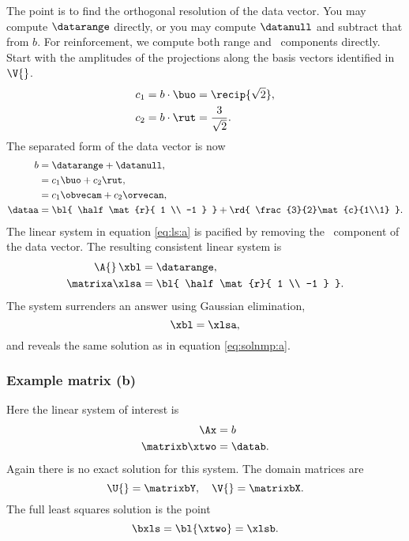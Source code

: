 %
The point is to find the orthogonal resolution of the data vector. You may compute $\datarange$ directly, or you may compute $\datanull$ and subtract that from $b$. For reinforcement, we compute both range and \ns\ components directly. Start with the amplitudes of the projections along the basis vectors identified in $\V{}$. 
\begin{equation}
  \begin{split}
    c_{1} = b \cdot \buo &= \recip{\sqrt{2}} , \\
    c_{2} = b \cdot \rut &= \frac{3}{\sqrt{2}} .
  \end{split}
\end{equation}
%
The separated form of the data vector is now
%
\begin{equation}
  \begin{split}
     b &= \datarange + \datanull, \\
       &= c_{1} \buo + c_{2} \rut, \\
       &= c_{1}\obvecam + c_{2}\orvecan, \\
     \dataa &= {\bl{ \half \mat{r}{ 1 \\ -1 } }} + {\rd{ \frac{3}{2}\mat{c}{1\\1} }}.
  \end{split}
  \label{eq:regularize:a}
\end{equation}
%
The linear system in equation \eqref{eq:ls:a} is pacified by removing the \ns\ component of the data vector. The resulting consistent linear system is
\begin{equation}
  \begin{split}
    \A{}\, \xbl &= \datarange, \\
    \matrixa \xlsa &= {\bl{ \half \mat{r}{ 1 \\ -1 } }} .
  \end{split}
\end{equation}
The system surrenders an answer using Gaussian elimination,
%
\begin{equation}
  \xbl = \xlsa,
\end{equation}
and reveals the same solution as in equation \eqref{eq:solnmp:a}.

\subsubsection{Example matrix (b)}
Here the linear system of interest is
%
\begin{equation}
  \begin{split}
    \Ax &= b \\
    \matrixb \xtwo &= \datab.
  \end{split}
  \label{eq:ls:b}
\end{equation}
%
Again there is no exact solution for this system.
%
The domain matrices are
\begin{equation}
  \U{} = \matrixbY, \quad \V{} = \matrixbX .
\end{equation}
%
The full least squares solution is the point
%
\begin{equation}
  \bxls = {\bl{ \xtwo }} = \xlsb.
\end{equation}
%

